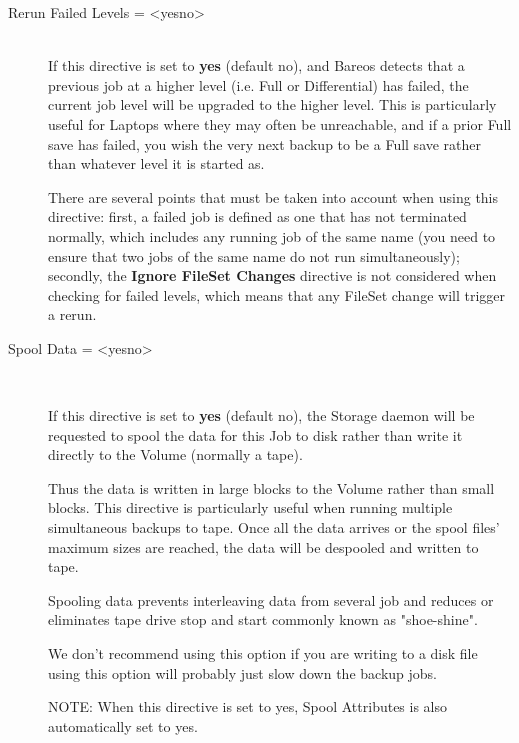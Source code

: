 \begin{description}
\item [Rerun Failed Levels = {\textless}yes{\textbar}no{\textgreater}] \hfill \\
If this directive is set to {\bf yes} (default no), and Bareos detects that
a previous job at a higher level (i.e.  Full or Differential) has failed,
the current job level will be upgraded to the higher level.  This is
particularly useful for Laptops where they may often be unreachable, and if
a prior Full save has failed, you wish the very next backup to be a Full
save rather than whatever level it is started as.

There are several points that must be taken into account when using this
directive: first, a failed job is defined as one that has not terminated
normally, which includes any running job of the same name (you need to
ensure that two jobs of the same name do not run simultaneously);
secondly, the {\bf Ignore FileSet Changes} directive is not considered
when checking for failed levels, which means that any FileSet change will
trigger a rerun.

\item [Spool Data = {\textless}yes{\textbar}no{\textgreater}] \hfill \\

If this directive is set  to {\bf yes} (default no), the Storage daemon will
be requested  to spool the data for this Job to disk rather than write it
directly to the Volume (normally a tape).

Thus the data is written in large blocks to the Volume rather than small
blocks.  This directive is particularly useful when running multiple
simultaneous backups to tape.  Once all the data arrives or the spool
files' maximum sizes are reached, the data will be despooled and written
to tape.

Spooling data prevents interleaving data from several job and reduces or
eliminates tape drive stop and start commonly known as "shoe-shine".

We don't recommend using this option if you are writing to a disk file
using this option will probably just slow down the backup jobs.

NOTE: When this directive is set to yes, Spool Attributes is also
automatically set to yes.


\end{description}

